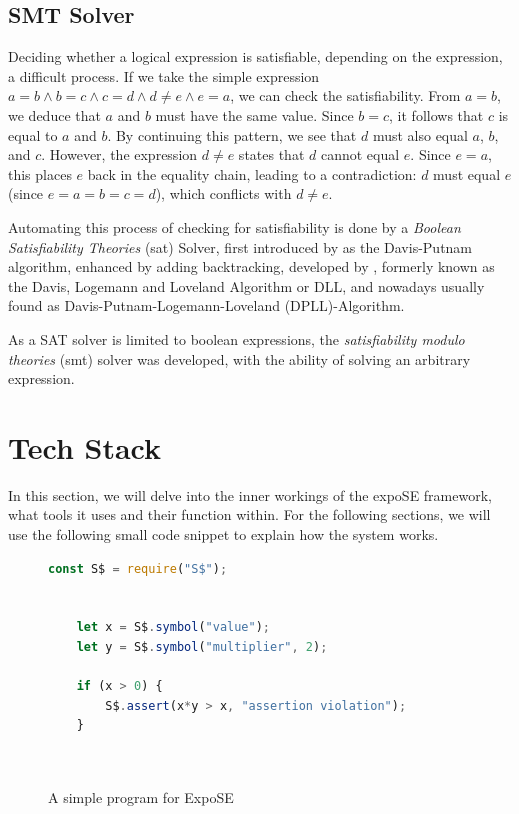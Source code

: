 \FloatBarrier
\subsection{SMT Solver}
\label{sec:smtsolver}
Deciding whether a logical expression is satisfiable, depending on the expression, a difficult process.
If we take the simple expression $a = b \land b= c\land c = d \land d \neq e \land e = a$, we can check the satisfiability.
From $a = b$, we deduce that $a$ and $b$ must have the same value. 
Since $b = c$, it follows that $c$ is equal to $a$ and $b$. 
By continuing this pattern, we see that $d$ must also equal $a$, $b$, and $c$. 
However, the expression $d \neq e$ states that $d$ cannot equal $e$. Since $e = a$, this places $e$ back in the equality chain, leading to a contradiction: $d$ must equal $e$ (since $e = a = b = c = d$), which conflicts with $d \neq e$.

Automating this process of checking for satisfiability is done by a \textit{Boolean Satisfiability Theories} (\gls{sat}) Solver, first introduced by  \citet{davis_computing_1960} as the Davis-Putnam algorithm, enhanced by adding backtracking, developed by \citet{davis_machine_1962}, formerly known as the Davis, Logemann and Loveland Algorithm or DLL, and nowadays usually found as Davis-Putnam-Logemann-Loveland (DPLL)-Algorithm. 

As a SAT solver is limited to boolean expressions, the \textit{satisfiability modulo theories }(\gls{smt}) solver was developed, with the ability of solving an arbitrary expression.

\cite{barrett_satisfiability_2009}


\section{Tech Stack}
\label{sec:tech}
In this section, we will delve into the inner workings of the expoSE framework, what tools it uses and their function within. 
For the following sections, we will use the following small code snippet to explain how the system works. 


\begin{figure}[h]
    \begin{lstlisting}[language=JavaScript, gobble=4]
    const S$ = require("S$");
    

    let x = S$.symbol("value"); 
    let y = S$.symbol("multiplier", 2);
    
    if (x > 0) {
        S$.assert(x*y > x, "assertion violation"); 
    }
    
   
    \end{lstlisting}
    \caption{A simple program for ExpoSE}
    \label{fig:expose-sample-program}
\end{figure}



